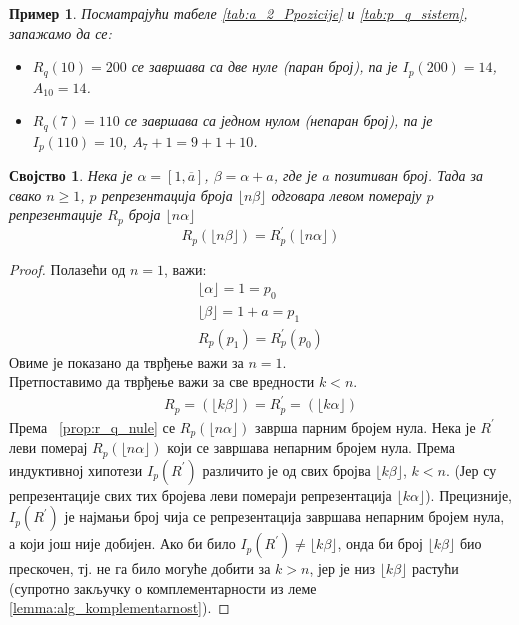 \documentclass[a4paper]{article}
\newtheorem{example}{Пример}
\newtheorem{property}{Својство}
\begin{document}
\begin{example}
	Посматрајући табеле \ref{tab:a_2_Ppozicije} и \ref{tab:p_q_sistem}, запажамо да се:
	\begin{itemize}
		\item $ R_q(10) = 200 $ се завршава са две нуле (паран број), па је $ I_{p}(200) = 14 $, $ A_{10} = 14 $.
		\item $ R_q(7) = 110 $ се завршава са једном нулом (непаран број), па је $ I_{p}(110) = 10 $, $ A_{7} + 1 = 9 + 1 + 10  $.
	\end{itemize}
\end{example}

\begin{property}
	\label{prop:levi_pomeraj}
	Нека је $ \alpha = [1,\overline{a}] $, $ \beta = \alpha + a $, где је $ a $ позитиван број. Тада за свако $ n \geq 1 $, $ p $ репрезентација броја $ \lfloor n \beta \rfloor $ одговара левом померају $ p $ репрезентације $ 
	R_{p} $ броја  $ \lfloor n \alpha \rfloor $	
		\begin{displaymath}
			R_{p} (\lfloor n \beta \rfloor) = R_{p}^{'} (\lfloor n \alpha \rfloor) 
		\end{displaymath}
\end{property}

\begin{proof}
	Полазећи од $ n = 1 $, важи:
		\begin{eqnarray*}
			\lfloor \alpha \rfloor = 1 = p_{0}\\
			\lfloor \beta \rfloor = 1 + a = p_{1}\\
			R_{p}(p_{1}) = R_{p}^{'}(p_{0})
		\end{eqnarray*}
	Овиме је показано да тврђење важи за $ n = 1 $.\\	
	Претпоставимо да тврђење важи за све вредности $ k < n $.	
		\begin{eqnarray*}
			R_{p} = (\lfloor k\beta \rfloor) = R_{p}^{'} = (\lfloor k\alpha \rfloor)
		\end{eqnarray*}	
	Према ~\eqref{prop:r_q_nule} се $ R_{p}(\lfloor n\alpha \rfloor) $ заврша парним бројем нула. Нека је $ R^{'} $ леви померај $ R_{p}(\lfloor n\alpha \rfloor) $ који се завршава непарним бројем нула. Према индуктивној хипотези $ I_{p}(R^{'}) $ различито је од свих бројва $ \lfloor k\beta \rfloor $, $ k < n $. (Јер су репрезентације свих тих бројева леви помераји репрезентација $ \lfloor k\alpha \rfloor $). Прецизније, $ I_{p}(R^{'}) $ је најмањи број чија се репрезентација завршава непарним бројем нула, а који још није добијен. Ако би било $ I_{p}(R^{'}) \neq \lfloor k\beta \rfloor $, онда би број $ \lfloor k\beta \rfloor $ био прескочен, тј. не га било могуће добити за $ k > n $, јер је низ $ \lfloor k\beta \rfloor $ растући (супротно закључку о комплементарности из леме \ref{lemma:alg_komplementarnost}).
\end{proof}
\end{document}
